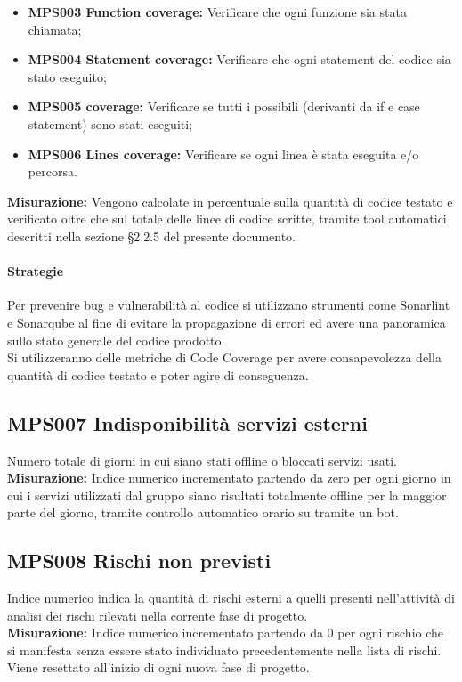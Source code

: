 \documentclass[NormeDiProgetto.tex]{subfiles}
\begin{document}
\begin{itemize}
	\item \textbf{MPS003 Function coverage:} Verificare che ogni funzione sia stata chiamata;
	\item \textbf{MPS004 Statement coverage:} Verificare che ogni statement del codice sia stato eseguito; 
	\item \textbf{MPS005  coverage:} Verificare se tutti i possibili  (derivanti da if e case statement) sono stati eseguiti;
	\item \textbf{MPS006 Lines coverage:} Verificare se ogni linea è stata eseguita e/o percorsa. 
	
\end{itemize}
\textbf{Misurazione:}
Vengono calcolate in percentuale sulla quantità di codice testato e verificato oltre che sul totale delle linee di codice scritte, tramite tool automatici descritti nella sezione \S 2.2.5 del presente documento.

\paragraph{Strategie}

Per prevenire bug e vulnerabilità al codice si utilizzano strumenti come Sonarlint e Sonarqube al fine di evitare la propagazione di errori ed avere una panoramica sullo stato generale del codice prodotto.\\
Si utilizzeranno delle metriche di Code Coverage per avere consapevolezza della quantità di codice testato e poter agire di conseguenza.

\subsection{MPS007 Indisponibilità servizi esterni} Numero totale di giorni in cui siano stati offline o bloccati servizi usati.\\
\textbf{Misurazione:}
Indice numerico incrementato partendo da zero per ogni giorno in cui i servizi utilizzati dal gruppo siano risultati totalmente offline per la maggior parte del giorno, tramite controllo automatico orario su  tramite un bot.

\subsection{MPS008 Rischi non previsti} Indice numerico indica la quantità di rischi esterni a quelli presenti nell'attività di analisi dei rischi rilevati nella corrente fase di progetto. \\
\textbf{Misurazione:}
Indice numerico incrementato partendo da 0 per ogni rischio che si manifesta senza essere stato individuato precedentemente nella lista di rischi.
Viene resettato all'inizio di ogni nuova fase di progetto.
\end{document}
